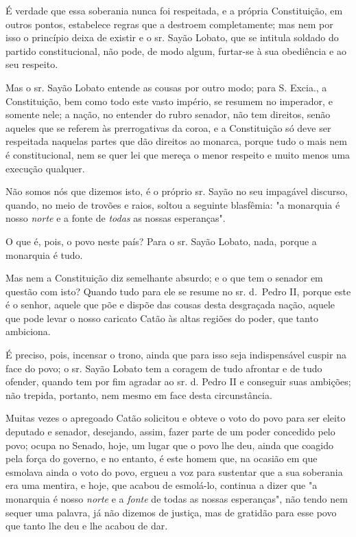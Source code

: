 É verdade que essa soberania nunca foi respeitada, e a própria
Constituição, em outros pontos, estabelece regras que a destroem
completamente; mas nem por isso o princípio deixa de existir e o sr.
Sayão Lobato, que se intitula soldado do partido constitucional, não
pode, de modo algum, furtar-se à sua obediência e ao seu respeito.

Mas o sr. Sayão Lobato entende as cousas por outro modo; para S. Excia.,
a Constituição, bem como todo este vasto império, se resumem no
imperador, e somente nele; a nação, no entender do rubro senador, não
tem direitos, senão aqueles que se referem às prerrogativas da coroa, e
a Constituição só deve ser respeitada naquelas partes que dão direitos
ao monarca, porque tudo o mais nem é constitucional, nem se quer lei que
mereça o menor respeito e muito menos uma execução qualquer.

Não somos nós que dizemos isto, é o próprio sr. Sayão no seu impagável
discurso, quando, no meio de trovões e raios, soltou a seguinte
blasfêmia: "a monarquia é nosso \emph{norte} e a fonte de \emph{todas}
as nossas esperanças".

O que é, pois, o povo neste país? Para o sr. Sayão Lobato, nada, porque
a monarquia é tudo.

Mas nem a Constituição diz semelhante absurdo; e o que tem o senador em
questão com isto? Quando tudo para ele se resume no sr. d.~Pedro II,
porque este é o senhor, aquele que põe e dispõe das cousas desta
desgraçada nação, aquele que pode levar o nosso caricato Catão às altas
regiões do poder, que tanto ambiciona.

É preciso, pois, incensar o trono, ainda que para isso seja
indispensável cuspir na face do povo; o sr. Sayão Lobato tem a coragem
de tudo afrontar e de tudo ofender, quando tem por fim agradar ao sr. d.
Pedro II e conseguir suas ambições; não trepida, portanto, nem mesmo em
face desta circunstância.

Muitas vezes o apregoado Catão solicitou e obteve o voto do povo para
ser eleito deputado e senador, desejando, assim, fazer parte de um poder
concedido pelo povo; ocupa no Senado, hoje, um lugar que o povo lhe deu,
ainda que coagido pela força do governo, e no entanto, é este homem que,
na ocasião em que esmolava ainda o voto do povo, ergueu a voz para
sustentar que a sua soberania era uma mentira, e hoje, que acabou de
esmolá-lo, continua a dizer que "a monarquia é nosso \emph{norte} e a
\emph{fonte} de todas as nossas esperanças", não tendo nem sequer uma
palavra, já não dizemos de justiça, mas de gratidão para esse povo que
tanto lhe deu e lhe acabou de dar.

